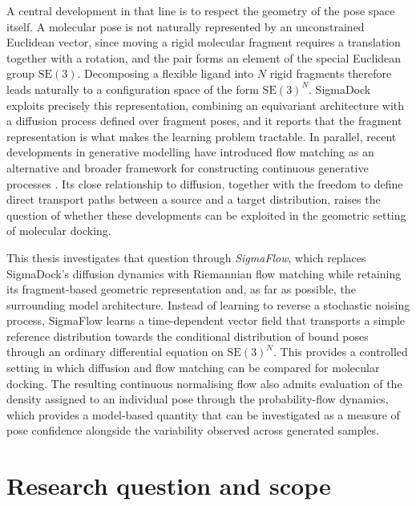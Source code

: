 \documentclass[11pt,a4paper]{report}
\theoremstyle{plain}
\theoremstyle{definition}
\theoremstyle{remark}
\newcommand{\SEthree}{\mathrm{SE}(3)}
\begin{document}
A central development in that line is to respect the geometry of the pose
space itself. A molecular pose is not naturally represented by an
unconstrained Euclidean vector, since moving a rigid molecular fragment
requires a translation together with a rotation, and the pair forms an element
of the special Euclidean group $\SEthree$. Decomposing a flexible ligand into
$N$ rigid fragments therefore leads naturally to a configuration space of the
form $\SEthree^{N}$. SigmaDock \citep{prat2026sigmadock} exploits precisely
this representation, combining an equivariant architecture with a diffusion
process defined over fragment poses, and it reports that the fragment
representation is what makes the learning problem tractable. In parallel,
recent developments in generative modelling have introduced flow matching as
an alternative and broader framework for constructing continuous generative
processes \citep{lipman2023flow,liu2023rectified,albergo2023stochastic}. Its
close relationship to diffusion, together with the freedom to define direct
transport paths between a source and a target distribution, raises the
question of whether these developments can be exploited in the geometric
setting of molecular docking.

This thesis investigates that question through \emph{SigmaFlow}, which
replaces SigmaDock's diffusion dynamics with Riemannian flow matching while
retaining its fragment-based geometric representation and, as far as possible,
the surrounding model architecture. Instead of learning to reverse a
stochastic noising process, SigmaFlow learns a time-dependent vector field
that transports a simple reference distribution towards the conditional
distribution of bound poses through an ordinary differential equation on
$\SEthree^{N}$. This provides a controlled setting in which diffusion and flow
matching can be compared for molecular docking. The resulting continuous
normalising flow also admits evaluation of the density assigned to an
individual pose through the probability-flow dynamics, which provides a
model-based quantity that can be investigated as a measure of pose confidence
alongside the variability observed across generated samples.

\section{Research question and scope}
\end{document}
